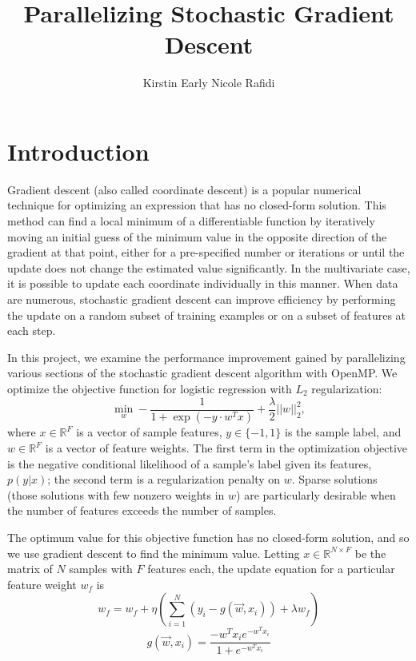 \documentclass{article}
\title{Parallelizing Stochastic Gradient Descent}
\author{Kirstin Early \qquad Nicole Rafidi}
\begin{document}
\maketitle

\section{Introduction}
Gradient descent (also called coordinate descent) is a popular numerical technique for optimizing an expression that has no closed-form solution. This method can find a local minimum of a differentiable function by iteratively moving an initial guess of the minimum value in the opposite direction of the gradient at that point, either for a pre-specified number or iterations or until the update does not change the estimated value significantly. In the multivariate case, it is possible to update each coordinate individually in this manner. When data are numerous, stochastic gradient descent can improve efficiency by performing the update on a random subset of training examples or on a subset of features at each step.

In this project, we examine the performance improvement gained by parallelizing various sections of the stochastic gradient descent algorithm with OpenMP. We optimize the objective function for logistic regression with $L_2$ regularization:
\begin{equation}
\underset{w}{\min}-\frac{1}{1 + \exp(-y \cdot w^T x)} + \frac{\lambda}{2}||w||^2_2,
\end{equation}
where $x \in \mathbb{R}^F$ is a vector of sample features, $y \in \lbrace -1, 1 \rbrace$ is the sample label, and $w \in \mathbb{R}^F$ is a vector of feature weights. The first term in the optimization objective is the negative conditional likelihood of a sample's label given its features, $p(y|x)$; the second term is a regularization penalty on $w$. Sparse solutions (those solutions with few nonzero weights in $w$) are particularly desirable when the number of features exceeds the number of samples.

The optimum value for this objective function has no closed-form solution, and so we use gradient descent to find the minimum value. Letting $x \in \mathbb{R}^{N \times F}$ be the matrix of $N$ samples with $F$ features each, the update equation for a particular feature weight $w_f$ is
\begin{equation}
w_f = w_f + \eta \left( \sum_{i = 1}^{N}(y_i - g(\vec{w}, x_i)) + \lambda w_f \right)
\end{equation}
\begin{equation}
g(\vec{w}, x_i) = \frac{-w^Tx_ie^{-w^Tx_i}}{1 + e^{-w^Tx_i}}
\end{equation}
\end{document}
